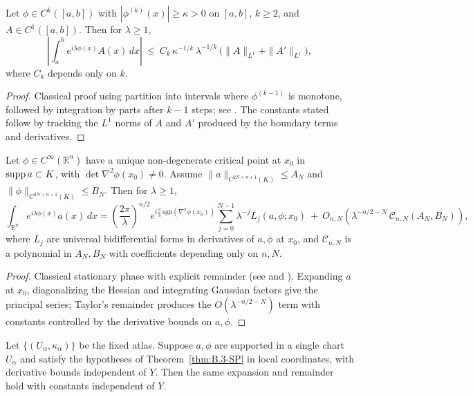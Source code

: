 \begin{lemma}\label{lem:B.3-VdC}
Let $\phi\in C^k([a,b])$ with $|\phi^{(k)}(x)|\ge \kappa>0$ on $[a,b]$, $k\ge 2$,
and $A\in C^1([a,b])$. Then for $\lambda\ge 1$,
\[
\left|\int_a^b e^{i\lambda\phi(x)}A(x)\,dx\right|
\ \le\ C_k\,\kappa^{-1/k}\,\lambda^{-1/k}\,\Big(\|A\|_{L^1} + \|A'\|_{L^1}\Big),
\]
where $C_k$ depends only on $k$.
\end{lemma}

\begin{proof}
Classical proof using partition into intervals where $\phi^{(k-1)}$ is monotone, followed by
integration by parts after $k-1$ steps; see \cite[Ch.~VIII, Thm.~1]{Stein93}. The constants stated
follow by tracking the $L^1$ norms of $A$ and $A'$ produced by the boundary terms and derivatives.
\end{proof}

\begin{theorem}\label{thm:B.3-SP}
Let $\phi\in C^\infty(\mathbb R^n)$ have a unique non-degenerate critical point at $x_0$
in $\operatorname{supp} a\subset K$, with $\det \nabla^2\phi(x_0)\neq 0$. Assume
$\|a\|_{C^{2N+n+1}(K)}\le A_{N}$ and $\|\phi\|_{C^{2N+n+2}(K)}\le B_{N}$.
Then for $\lambda\ge 1$,
\[
\int_{\mathbb R^n} e^{i\lambda\phi(x)}a(x)\,dx
= \left(\frac{2\pi}{\lambda}\right)^{n/2} e^{i\frac{\pi}{4}\,\mathrm{sgn}(\nabla^2\phi(x_0))}
\sum_{j=0}^{N-1}\lambda^{-j} L_j(a,\phi;x_0)
\ +\ O_{n,N}\!\left(\lambda^{-n/2-N}\, \mathcal C_{n,N}(A_{N},B_{N})\right),
\]
where $L_j$ are universal bidifferential forms in derivatives of $a,\phi$ at $x_0$, and
$\mathcal C_{n,N}$ is a polynomial in $A_N,B_N$ with coefficients depending only on $n,N$.
\end{theorem}

\begin{proof}
Classical stationary phase with explicit remainder (see \cite[Thm.~7.7.5]{HormanderI} and
\cite[§3. stationary phase]{Zworski}). Expanding $a$ at $x_0$, diagonalizing the Hessian
and integrating Gaussian factors give the principal series; Taylor’s remainder produces the
$O(\lambda^{-n/2-N})$ term with constants controlled by the derivative bounds on $a,\phi$.
\end{proof}

\begin{corollary}\label{cor:B.3-SP-charts}
Let $\{(U_\alpha,\kappa_\alpha)\}$ be the fixed atlas. Suppose $a,\phi$ are supported in
a single chart $U_\alpha$ and satisfy the hypotheses of Theorem~\ref{thm:B.3-SP} in local
coordinates, with derivative bounds independent of $Y$. Then the same expansion and remainder
hold with constants independent of $Y$.
\end{corollary}

